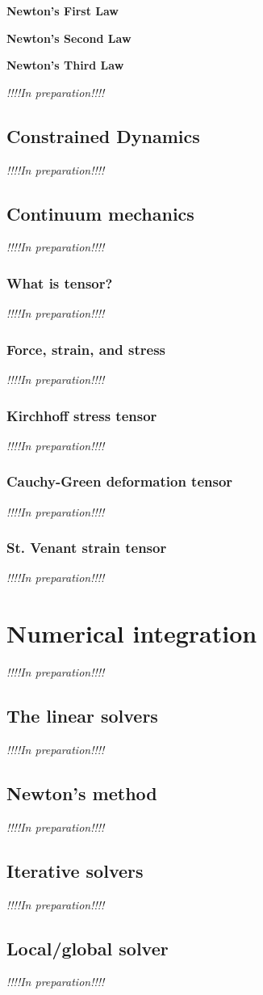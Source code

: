 \documentclass[pdflatex,sn-mathphys-num]{sn-jnl}%
\theoremstyle{thmstyleone}%
\theoremstyle{thmstyletwo}%
\theoremstyle{thmstylethree}%
\newcommand{\inprep}{
	\begin{center}
		\sl\rm {!!!!In preparation!!!!}
\end{center}}
\begin{document}
{\noindent\rm\bf\large Newton's First Law}

{\noindent\rm\bf\large Newton's Second Law}

{\noindent\rm\bf\large Newton's Third Law}

\inprep

\subsection{Constrained Dynamics}
\inprep
\subsection{Continuum mechanics}
\inprep
\subsubsection{What is tensor?}
\inprep
\subsubsection{Force, strain, and stress}
\inprep
\subsubsection{Kirchhoff stress tensor}
\inprep
\subsubsection{Cauchy-Green deformation tensor}
\inprep
\subsubsection{St. Venant strain tensor}
\inprep

\section{Numerical integration}
\inprep
\subsection{The linear solvers}
\inprep
\subsection{Newton's method}
\inprep
\subsection{Iterative solvers}
\inprep
\subsection{Local/global solver}
\inprep
\end{document}
